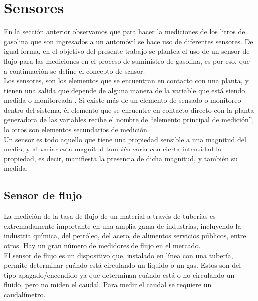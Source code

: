 \section{Sensores}
En la sección anterior observamos que para hacer la mediciones de los litros de gasolina que son ingresados a un automóvil se hace uso de diferentes sensores. De igual forma, en el objetivo del presente trabajo se plantea el uso de un sensor de flujo para las mediciones en el proceso de suministro de gasolina, es por eso, que a continuación se define el concepto de sensor.
\\
Los sensores, son los elementos que se encuentran en contacto con una planta, y tienen una salida que depende de alguna manera de la variable que está siendo medida o monitoreada \citep{MarcoTeorico10}. Si existe más de un elemento de sensado o monitoreo dentro del sistema, él elemento que se encuentre en contacto directo con la planta generadora de las variables recibe el nombre de “elemento principal de medición”, lo otros son elementos secundarios de medición.
\\
Un sensor es todo aquello que tiene una propiedad sensible a una magnitud del medio, y al variar esta magnitud también varia con cierta intensidad la propiedad, es decir, manifiesta la presencia de dicha magnitud, y también su medida.

\subsection{Sensor de flujo}
La medición de la tasa de flujo de un material a través de tuberías es extremadamente importante en
una amplia gama de industrias, incluyendo la industria química, del petróleo, del acero, de alimentos servicios públicos, entre otros. \citep{MarcoTeorico10}
Hay un gran número de medidores de flujo en el mercado. 
\\
El sensor de flujo es un dispositivo que, instalado en línea con una tubería, permite determinar cuándo está circulando un líquido o un gas. Estos son del tipo apagado/encendido ya que  determinan cuándo está o no circulando un fluido, pero no miden el caudal. Para medir el caudal se requiere un caudalímetro.

